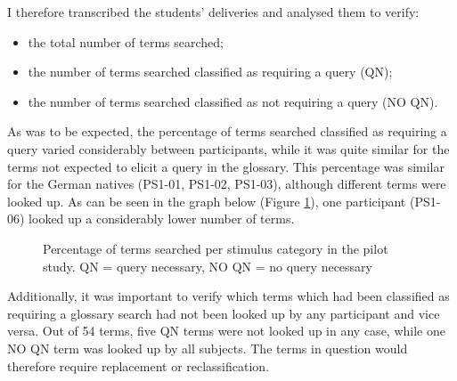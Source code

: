 I therefore transcribed the students' deliveries and analysed them to verify:

\begin{itemize}
\item the total number of terms searched;
\item the number of terms searched classified as requiring a query (QN);
\item the number of terms searched classified as not requiring a query (NO QN).
\end{itemize}
As was to be expected, the percentage of terms searched classified as requiring a query varied considerably between participants, while it was quite similar for the terms not expected to elicit a query in the glossary. This percentage was similar for the German natives (PS1-01, PS1-02, PS1-03), although different terms were looked up. As can be seen in the graph below (Figure \ref{fig:searches_PS}), one participant (PS1-06) looked up a considerably lower number of terms.

\begin{figure}[ht]
\caption[Terms searched in pilot study]{Percentage of terms searched per stimulus category in the pilot study. QN = query necessary, NO QN = no query necessary \citep[47]{prandi_exploratory_2018}}
\label{fig:searches_PS}
\end{figure}

Additionally, it was important to verify which terms which had been classified as requiring a glossary search had not been looked up by any participant and vice versa. Out of 54 terms, five QN terms were not looked up in any case, while one NO QN term was looked up by all subjects. The terms in question would therefore require replacement or reclassification.



